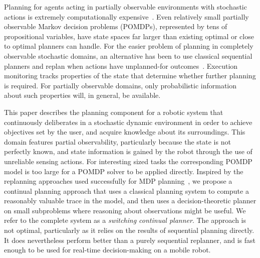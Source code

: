 \documentclass{article}
\begin{document}
Planning for agents acting in partially observable environments with
stochastic actions is extremely computationally
expensive~\cite{mdp-complexity}. Even relatively small partially
observable Markov decision problems (POMDPs), represented by tens of
propositional variables, have state spaces far larger than existing
optimal or close to optimal planners can handle. For the easier
problem of planning in completely observable stochastic domains, an
alternative has been to use classical sequential planners and
replan when actions have unplanned-for outcomes~\cite{yoon:etal:2007}.
Execution monitoring tracks properties of the state that determine
whether further planning is required. For partially observable
domains, only probabilistic information about such properties will, in
general, be available.


This paper describes the planning component for a robotic system that
continuously deliberates in a stochastic dynamic environment in order
to achieve objectives set by the user, and acquire knowledge about its
surroundings. This domain features partial observability, particularly
because the state is not perfectly known, and state information is
gained by the robot through the use of unreliable sensing
actions. 
For
interesting sized tasks the corresponding POMDP model is too large for a
POMDP solver to be applied directly. Inspired by the replanning
approaches used successfully for MDP
planning~\cite{yoon:etal:2007,yoon:etal:2008}, we propose a continual
planning approach that uses a classical planning system to compute a
reasonably valuable trace in the model, and then uses a
decision-theoretic planner on small subproblems where reasoning about
observations might be useful. We refer to the complete system as a
{\em switching continual planner}. The approach is not optimal,
particularly as it relies on the results of sequential planning
directly. It does nevertheless perform better than a purely sequential
replanner, and is fast enough to be used for real-time decision-making
on a mobile robot.


\end{document}

